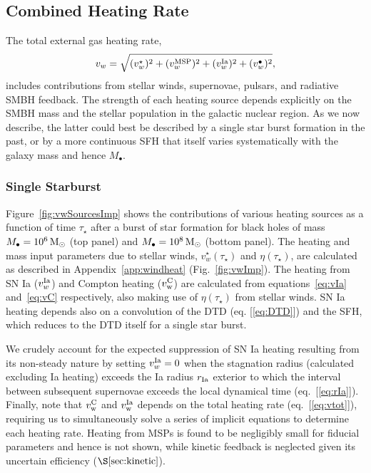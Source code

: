 \documentclass[usenatbib,fleqn]{mn2e}
\newcommand{\Mbh}[1][]{M_{\bullet#1}}
\newcommand{\vwO}{v_{w}}
\begin{document}
\subsection{Combined Heating Rate} 
\label{sec:combined}


The total external gas heating rate, 
\begin{equation}
\vwO = \sqrt{(v_{w}^{\star})^{2} + (v_{w}^{\rm MSP})^{2} + (v_{w}^{\rm Ia})^{2} + (v_{w}^{\bullet})^{2}},
\label{eq:vtot}
\end{equation}
includes contributions from stellar winds, supernovae, pulsars, and
radiative SMBH feedback.  The strength of each heating source depends
explicitly on the SMBH mass and the stellar population in the galactic
nuclear region.  As we now describe, the latter could best be
described by a single star burst formation in the past, or by a more
continuous SFH that itself varies systematically
with the galaxy mass and hence $\Mbh$.

\subsubsection{Single Starburst}

Figure~\ref{fig:vwSourcesImp} shows the contributions of various
heating sources as a function of time $\tau_{\star}$ after a burst of
star formation for black holes of mass $\Mbh = 10^{6} \Msun$ (top
panel) and $\Mbh = 10^{8} \Msun$ (bottom panel). The heating and mass
input parameters due to stellar winds, $v_{w}^{\star}(\tau_{\star})$
and $\eta(\tau_{\star})$, are calculated as described in
Appendix~\ref{app:windheat} (Fig.~\ref{fig:vwImp}).  The heating from
SN Ia ($v_{w}^{\rm Ia}$) and Compton heating ($v_{\rm w}^{\rm C}$) are
calculated from equations~\eqref{eq:vIa} and~\eqref{eq:vC}
respectively, also making use of $\eta(\tau_{\star})$ from stellar
winds.  SN Ia heating depends also on a convolution of the DTD
(eq. [\ref{eq:DTD}]) and the SFH, which reduces to
the DTD itself for a single star burst.

We crudely account for the expected suppression of SN Ia heating
resulting from its non-steady nature by setting $v_{w}^{\rm Ia} = 0$
when the stagnation radius (calculated excluding Ia heating) exceeds
the Ia radius $r_{\rm Ia}$ exterior to which the interval between
subsequent supernovae exceeds the local dynamical time
(eq.~[\ref{eq:rIa}]).  Finally, note that $v_{\rm w}^{\rm C}$ and $v_{\rm w}^{\rm Ia}$
depends on the total heating rate (eq.~[\ref{eq:vtot}]), requiring us
to simultaneously solve a series of implicit equations to determine
each heating rate.  Heating from MSPs is found to be negligibly small
for fiducial parameters and hence is not shown, while kinetic feedback
is neglected given its uncertain efficiency ($\S\ref{sec:kinetic}$).
\end{document}
